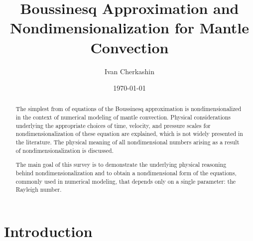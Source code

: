 \documentclass[
10pt, %
a4paper, %
oneside, %
headinclude,footinclude, %
BCOR5mm, %
]{scrartcl}
\begin{document}
\title{Boussinesq Approximation and Nondimensionalization for Mantle Convection}


\author{Ivan Cherkashin}




\date{\today}

\maketitle

\begin{abstract}
The simplest from of equations of the Boussinesq approximation is nondimensionalized in the context of numerical modeling of mantle convection. Physical considerations underlying the appropriate choices of time, velocity, and pressure scales for nondimensionalization of these equation are explained, which is not widely presented in the literature. The physical meaning of all nondimensional numbers arising as a result of nondimensionalization is discussed. 

The main goal of this survey is to demonstrate the underlying physical reasoning behind nondimensionalization and to obtain a nondimensional form of the equations, commonly used in numerical modeling, that depends only on a single parameter: the Rayleigh number.
\end{abstract}

\tableofcontents

\section*{Introduction}
\end{document}
